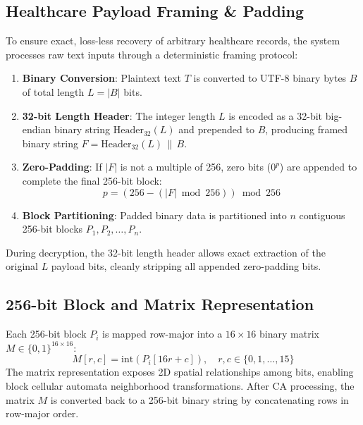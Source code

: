 \subsection{Healthcare Payload Framing \& Padding}
\label{subsec:payload_framing}
To ensure exact, loss-less recovery of arbitrary healthcare records, the system processes raw text inputs through a deterministic framing protocol:
\begin{enumerate}
    \item \textbf{Binary Conversion}: Plaintext text $T$ is converted to UTF-8 binary bytes $B$ of total length $L = |B|$ bits.
    \item \textbf{32-bit Length Header}: The integer length $L$ is encoded as a 32-bit big-endian binary string $\text{Header}_{32}(L)$ and prepended to $B$, producing framed binary string $F = \text{Header}_{32}(L) \,\|\, B$.
    \item \textbf{Zero-Padding}: If $|F|$ is not a multiple of 256, zero bits ($0^p$) are appended to complete the final 256-bit block:
    \begin{equation}
    p = (256 - (|F| \bmod 256)) \bmod 256
    \end{equation}
    \item \textbf{Block Partitioning}: Padded binary data is partitioned into $n$ contiguous 256-bit blocks $P_1, P_2, \dots, P_n$.
\end{enumerate}
During decryption, the 32-bit length header allows exact extraction of the original $L$ payload bits, cleanly stripping all appended zero-padding bits.

\subsection{256-bit Block and Matrix Representation}
\label{subsec:block_matrix}
Each 256-bit block $P_i$ is mapped row-major into a $16 \times 16$ binary matrix $M \in \{0, 1\}^{16 \times 16}$:
\begin{equation}
M[r, c] = \text{int}(P_i[16r + c]), \quad r, c \in \{0, 1, \dots, 15\}
\end{equation}
The matrix representation exposes 2D spatial relationships among bits, enabling block cellular automata neighborhood transformations. After CA processing, the matrix $M$ is converted back to a 256-bit binary string by concatenating rows in row-major order.

